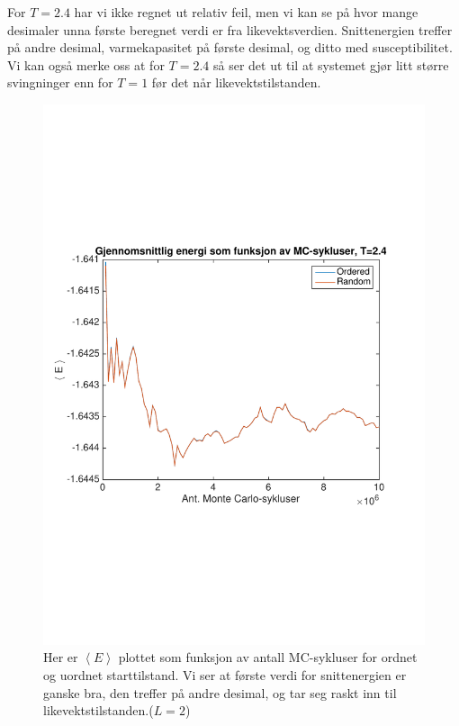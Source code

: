 \documentclass[norsk, 10pt]{article}
\def\mean#1{\left\langle #1 \right\rangle}
\begin{document}
For $T=2.4$ har vi ikke regnet ut relativ feil, men vi kan se på hvor mange desimaler unna første beregnet verdi er fra likevektsverdien. Snittenergien treffer på andre desimal, varmekapasitet på første desimal, og ditto med susceptibilitet. Vi kan også merke oss at for $T=2.4$ så ser det ut til at systemet gjør litt større svingninger enn for $T=1$ før det når likevektstilstanden.

\begin{figure}[H]
\centering
\includegraphics[scale = 0.5, trim = 1cm 8cm 1cm 8cm]{b_avgEnergy_MC_L2_T24.pdf}
\caption{Her er $\mean E$ plottet som funksjon av antall MC-sykluser for ordnet og uordnet starttilstand. Vi ser at første verdi for snittenergien er ganske bra, den treffer på andre desimal, og tar seg raskt inn til likevektstilstanden.($L=2$)}
\label{fig:meanET24}
\end{figure}
\end{document}
